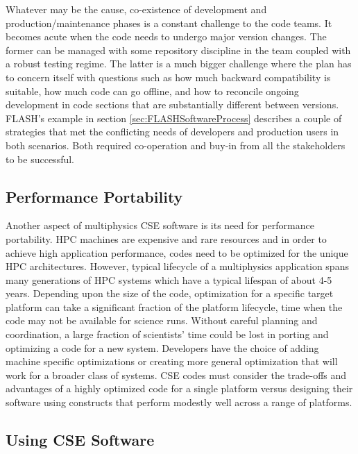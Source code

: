 Whatever may be the cause, co-existence of development and
production/maintenance phases is a constant challenge to the code
teams. It becomes acute when the code needs to undergo major version
changes. The former can be managed with some repository
discipline in the team coupled with a robust testing regime. The latter
is a much bigger challenge where the plan has to concern itself with
questions such as how much backward compatibility is suitable, how
much code can go offline, and how to reconcile ongoing development in
code sections that are substantially different between versions.
FLASH's example in section \ref{sec:FLASHSoftwareProcess} describes
a couple of strategies that met the conflicting needs of developers and
production users in both scenarios. Both required co-operation and
buy-in from all the stakeholders to be successful. 


\subsection{Performance Portability}
\label{sec:perfport}

Another aspect of multiphysics CSE software is its need for
performance portability. HPC machines are expensive and rare resources and in order to achieve high application performance, codes need to be optimized for the unique HPC architectures.
 However, typical lifecycle of a
multiphysics application spans many generations of HPC systems which have a typical lifespan of about 4-5 years.  Depending upon the size of the
code, optimization for a specific target platform can take a
significant fraction of the platform lifecycle, time when the code may not be available for science runs.  Without careful planning and coordination,  a
large fraction of scientists' time could be lost in porting and optimizing
a code for a new system.  Developers have the choice of adding machine
specific optimizations or creating more general optimization that will
work for a broader class of systems.  CSE codes must consider the
trade-offs and advantages of a highly optimized code for a single
platform versus designing their software using constructs that perform
modestly well across a range of platforms. 



\subsection{Using CSE Software}

